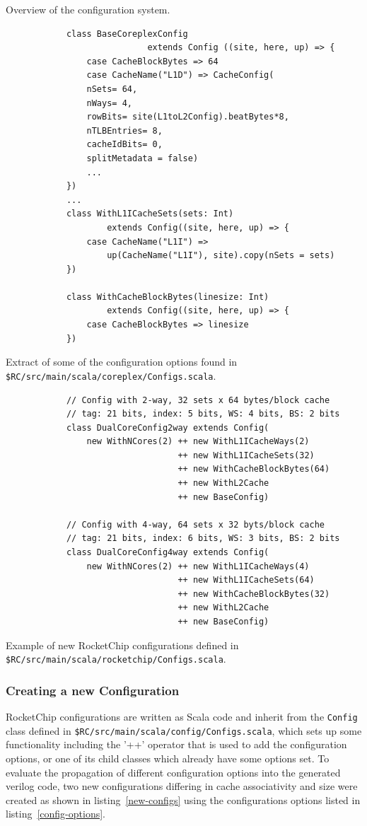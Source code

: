 \documentclass[journal,a4paper]{IEEEtran}
\begin{document}
\begin{table}
	\caption{Overview of the configuration system.}
	\begin{subtable}[b]{0.9\linewidth}
		\begin{verbatim}
			class BaseCoreplexConfig
							extends Config ((site, here, up) => {
				case CacheBlockBytes => 64
				case CacheName("L1D") => CacheConfig(
				nSets= 64,
				nWays= 4,
				rowBits= site(L1toL2Config).beatBytes*8,
				nTLBEntries= 8,
				cacheIdBits= 0,
				splitMetadata = false)
				...
			})
			...
			class WithL1ICacheSets(sets: Int)
					extends Config((site, here, up) => {
				case CacheName("L1I") =>
					up(CacheName("L1I"), site).copy(nSets = sets)
			})

			class WithCacheBlockBytes(linesize: Int)
					extends Config((site, here, up) => {
				case CacheBlockBytes => linesize
			})
		\end{verbatim}
		\caption{Extract of some of the configuration options found in \texttt{\$RC/src/main/scala/coreplex/Configs.scala}.}
		\label{config-options}
	\end{subtable}
	\begin{subtable}[b]{0.9\linewidth}
		\begin{verbatim}
			// Config with 2-way, 32 sets x 64 bytes/block cache
			// tag: 21 bits, index: 5 bits, WS: 4 bits, BS: 2 bits
			class DualCoreConfig2way extends Config(
				new WithNCores(2) ++ new WithL1ICacheWays(2)
				                  ++ new WithL1ICacheSets(32)
				                  ++ new WithCacheBlockBytes(64)
				                  ++ new WithL2Cache
				                  ++ new BaseConfig)

			// Config with 4-way, 64 sets x 32 byts/block cache
			// tag: 21 bits, index: 6 bits, WS: 3 bits, BS: 2 bits
			class DualCoreConfig4way extends Config(
				new WithNCores(2) ++ new WithL1ICacheWays(4)
				                  ++ new WithL1ICacheSets(64)
				                  ++ new WithCacheBlockBytes(32)
				                  ++ new WithL2Cache
				                  ++ new BaseConfig)
		\end{verbatim}
		\caption{Example of new RocketChip configurations defined in \texttt{\$RC/src/main/scala/rocketchip/Configs.scala}.}
		\label{new-configs}
	\end{subtable}
\end{table}
\subsubsection{Creating a new Configuration}
RocketChip configurations are written as Scala code and inherit from the \texttt{Config} class defined in \texttt{\$RC/src/main/scala/config/Configs.scala}, which sets up some functionality including the '++' operator that is used to add the configuration options, or one of its child classes which already have some options set.
To evaluate the propagation of different configuration options into the generated verilog code, two new configurations differing in cache associativity and size were created as shown in listing~\ref{new-configs} using the configurations options listed in listing~\ref{config-options}.
\end{document}
